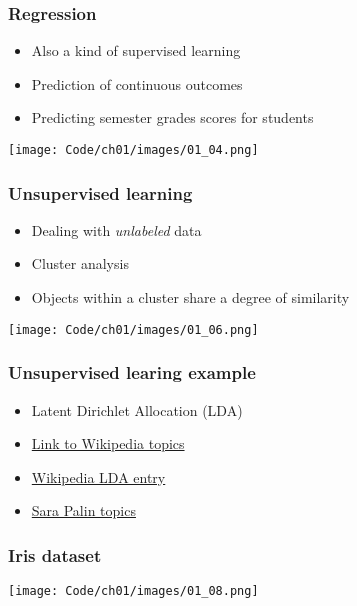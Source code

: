 \documentclass{beamer}
\begin{document}
\begin{frame}
  \frametitle{Regression}
  \begin{itemize}
  \item Also a kind of supervised learning
  \item Prediction of continuous outcomes
  \item Predicting semester grades scores for students
  \end{itemize}
  \center
  \texttt{[image: Code/ch01/images/01\_04.png]}
\end{frame}

\begin{frame}
  \frametitle{Unsupervised learning}
  \begin{itemize}
  \item Dealing with \textit{unlabeled} data
  \item Cluster analysis
  \item Objects within a cluster share a degree of similarity
  \end{itemize}
  \center
  \texttt{[image: Code/ch01/images/01\_06.png]}
\end{frame}

\begin{frame}
  \frametitle{Unsupervised learing example}
  \begin{itemize}
  \item Latent Dirichlet Allocation (LDA)
  \item \href{http://www.princeton.edu/~achaney/tmve/wiki100k/browse/topic-presence.html}{Link to Wikipedia topics}
  \item \href {https://en.wikipedia.org/wiki/Latent_Dirichlet_allocation}{Wikipedia LDA entry}
    \item \href{http://blog.echen.me/2011/06/27/topic-modeling-the-sarah-palin-emails/}{Sara Palin topics}
  \end{itemize}
\end{frame}

\begin{frame}
  \frametitle{Iris dataset}
  \texttt{[image: Code/ch01/images/01\_08.png]}
\end{frame}
\end{document}
